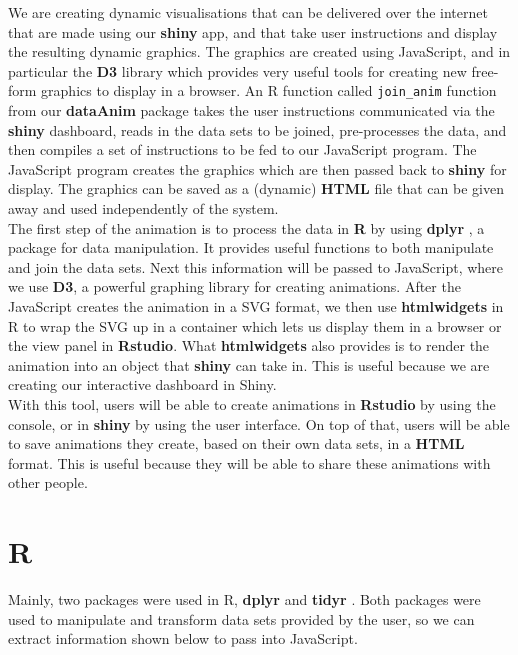 We are creating dynamic visualisations that can be delivered over the internet that are made using our \textbf{shiny} app, and that take user instructions and display the resulting dynamic graphics. The graphics are created using \textsf{JavaScript}, and in particular the \textbf{D3} library which provides very useful tools for creating new free-form graphics to display in a browser.  An \textsf{R} function called \texttt{join\_anim} function from our \textbf{dataAnim} package takes the user instructions communicated via the \textbf{shiny} dashboard, reads in the data sets to be joined, pre-processes the data, and then compiles a set of instructions to be fed to our \textsf{JavaScript} program.  The \textsf{JavaScript} program creates the graphics which are then passed back to \textbf{shiny} for display. The graphics can be saved as a (dynamic) \textbf{HTML} file that can be given away and used independently of the system. \\

The first step of the animation is to process the data in \textbf{R} by using \textbf{dplyr} \citep{dplyr}, a package for data manipulation. It provides useful functions to both manipulate and join the data sets. Next this information will be passed to \textsf{JavaScript}, where we use \textbf{D3}, a powerful graphing library for creating animations. After the JavaScript creates the animation in a SVG format, we then use \textbf{htmlwidgets} in \textsf{R} to wrap the SVG up in a container which lets us display them in a browser or the view panel in \textbf{Rstudio}. What \textbf{htmlwidgets} also provides is to render the animation into an object that \textbf{shiny} can take in. This is useful because we are  creating our interactive dashboard in Shiny. \\

With this tool, users will be able to create animations in \textbf{Rstudio} by using the console, or in \textbf{shiny} by using the user interface. On top of that, users will be able to save animations they create, based on their own data sets, in a \textbf{HTML} format. This is useful because they will be able to share these animations with other people.

\section{R}
Mainly, two packages were used in \textsf{R}, \textbf{dplyr} and \textbf{tidyr} \citep{tidyr}. Both packages were used to manipulate and transform data sets provided by the user, so we can extract information shown below to pass into \textsf{JavaScript}. 

